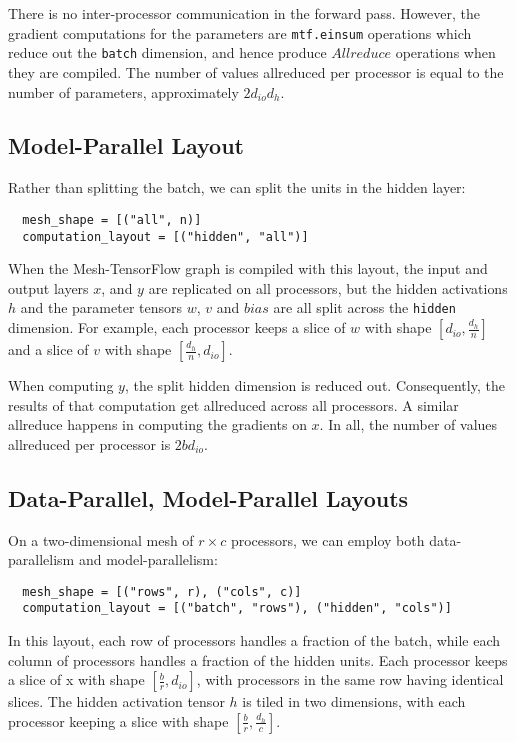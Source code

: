 \documentclass{article}
\begin{document}
There is no inter-processor communication in the forward pass. However, the gradient computations for the parameters are \texttt{mtf.einsum} operations which reduce out the \texttt{batch} dimension, and hence produce $Allreduce$ operations when they are compiled.  The number of values allreduced per processor is equal to the number of parameters, approximately $2d_{io}d_h$.

\subsection{Model-Parallel Layout} \label{exmp}
Rather than splitting the batch, we can split the units in the hidden layer:
\begin{verbatim}
  mesh_shape = [("all", n)]
  computation_layout = [("hidden", "all")]
\end{verbatim}
When the Mesh-TensorFlow graph is compiled with this layout, the input and output layers $x$, and $y$ are replicated on all processors, but the hidden activations $h$ and the parameter tensors $w$, $v$ and $bias$ are all split across the \texttt{hidden} dimension.   For example, each processor keeps a slice of $w$ with shape $[d_{io}, \frac{d_h}{n}]$ and a slice of $v$ with shape $[\frac{d_h}{n}, d_{io}]$.

When computing $y$, the split hidden dimension is reduced out.  Consequently, the results of that computation get allreduced across all processors.  A similar allreduce happens in computing the gradients on $x$.  In all, the number of values allreduced per processor is $2bd_{io}$.


\subsection{Data-Parallel, Model-Parallel Layouts}
On a two-dimensional mesh of $r \times c$ processors, we can employ both data-parallelism and model-parallelism:
\begin{verbatim}
  mesh_shape = [("rows", r), ("cols", c)]
  computation_layout = [("batch", "rows"), ("hidden", "cols")]
\end{verbatim}

In this layout, each row of processors handles a fraction of the batch, while each column of processors handles a fraction of the hidden units.  Each processor keeps a slice of x with shape $[\frac{b}{r}, d_{io}]$, with processors in the same row having identical slices.  The hidden activation tensor $h$ is tiled in two dimensions, with each processor keeping a slice with shape $[\frac{b}{r}, \frac{d_h}{c}]$.
\end{document}
